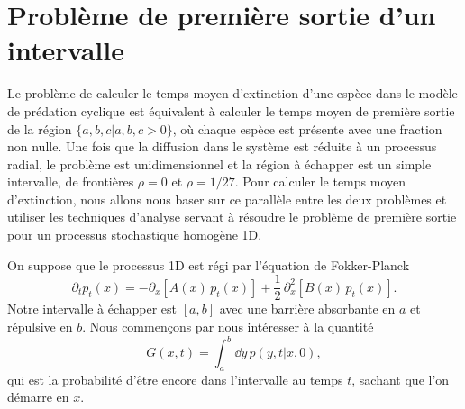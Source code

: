 \documentclass[openany,a4paper,12pt]{article}
\begin{document}
\section{Problème de première sortie d'un intervalle}
\label{section_echap}

\par Le problème de calculer le temps moyen d'extinction d'une espèce dans le modèle de prédation cyclique est équivalent à calculer le temps moyen de première sortie de la région $\{a,b,c|a,b,c>0\}$, où chaque espèce est présente avec une fraction non nulle. Une fois que la diffusion dans le système est réduite à un processus radial, le problème est unidimensionnel et la région à échapper est un simple intervalle, de frontières $\rho=0$ et $\rho=1/27$. Pour calculer le temps moyen d'extinction, nous allons nous baser sur ce parallèle entre les deux problèmes et utiliser les techniques d'analyse servant à résoudre le problème de première sortie pour un processus stochastique homogène 1D.

\par On suppose que le processus 1D est régi par l'équation de Fokker-Planck
%
\begin{equation}\label{echap_eq_FP}
	\partial_t p_t(x) = - \partial_x[ A(x) \, p_t(x) ] + \frac 12 \, \partial_x^2 [ B(x) \, p_t(x) ] .
\end{equation}
%
Notre intervalle à échapper est $[a,b]$ avec une barrière absorbante en $a$ et répulsive en $b$. Nous commençons par nous intéresser à la quantité 
%
\begin{equation}\label{echap_def_G}
	G(x,t) = \int_a^b \dd y \, p(y,t|x,0),
\end{equation}
%
qui est la probabilité d'être encore dans l'intervalle au temps $t$, sachant que l'on démarre en $x$.
\end{document}
